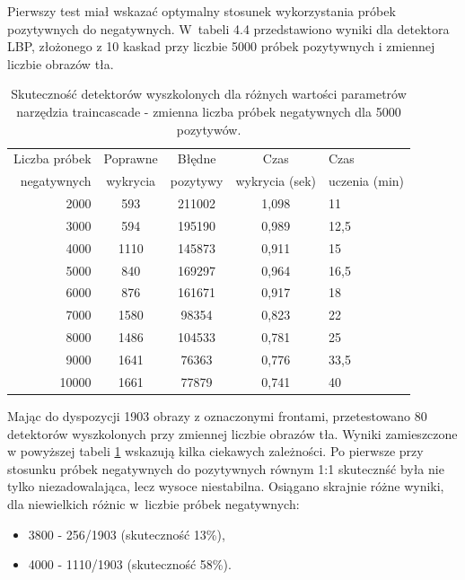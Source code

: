 Pierwszy test miał wskazać optymalny stosunek wykorzystania próbek pozytywnych
do negatywnych. W~tabeli 4.4 przedstawiono wyniki dla detektora LBP, 
złożonego z 10 kaskad
przy liczbie 5000 próbek pozytywnych i zmiennej liczbie obrazów tła.

\begin{table}[!h]
	\centering                                                          
	\caption{Skuteczność detektorów wyszkolonych 
		dla różnych wartości parametrów narzędzia traincascade 
		- zmienna liczba próbek negatywnych dla 5000 pozytywów.
	}
	\begin{tabular}{r|c|c|c|l}
		Liczba próbek & Poprawne & Błędne   & Czas         & Czas    \\
		negatywnych   & wykrycia & pozytywy & wykrycia (sek) & uczenia (min) \\
		\hline
		2000        & 593      & 211002   & 1,098       & 11 \\
		3000        & 594      & 195190   & 0,989       & 12,5 \\
		4000        & 1110     & 145873   & 0,911       & 15 \\
		5000        & 840      & 169297   & 0,964       & 16,5 \\
		6000        & 876      & 161671   & 0,917       & 18 \\
		7000        & 1580     & 98354    & 0,823       & 22 \\
		8000        & 1486     & 104533   & 0,781       & 25 \\
		9000        & 1641     & 76363    & 0,776       & 33,5 \\
		10000       & 1661     & 77879    & 0,741       & 40 \\
	\end{tabular} 
	\label{tab:it1detectorlist}
\end{table}

Mając do dyspozycji 1903 obrazy z oznaczonymi frontami, przetestowano 80 detektorów
wyszkolonych przy zmiennej liczbie obrazów tła. Wyniki zamieszczone w powyższej tabeli
\ref{tab:it1detectorlist} wskazują kilka ciekawych zależności. Po pierwsze przy stosunku próbek negatywnych do
pozytywnych równym 1:1 skutecznść była nie tylko niezadowalająca, lecz wysoce niestabilna.
Osiągano skrajnie różne wyniki, dla niewielkich 
różnic w~liczbie próbek negatywnych:

\begin{itemize}
	\item 3800 - 256/1903 (skuteczność 13\%),
	\item 4000 - 1110/1903 (skuteczność 58\%).
\end{itemize}

